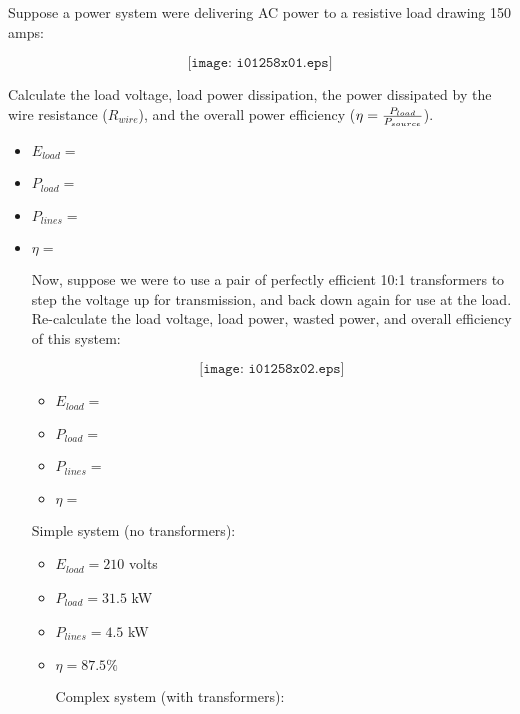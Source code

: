 

Suppose a power system were delivering AC power to a resistive load drawing 150 amps:

$$\texttt{[image: i01258x01.eps]}$$

Calculate the load voltage, load power dissipation, the power dissipated by the wire resistance ($R_{wire}$), and the overall power efficiency ($\eta = {P_{load} \over P_{source}}$).

\begin{itemize}
\item {} $E_{load} = $ 
\item {} $P_{load} = $ 
\item {} $P_{lines} = $ 
\item {} $\eta = $ 
\bigskip

Now, suppose we were to use a pair of perfectly efficient 10:1 transformers to step the voltage up for transmission, and back down again for use at the load.  Re-calculate the load voltage, load power, wasted power, and overall efficiency of this system:

$$\texttt{[image: i01258x02.eps]}$$

\begin{itemize}
\item {} $E_{load} = $ 
\item {} $P_{load} = $ 
\item {} $P_{lines} = $ 
\item {} $\eta = $ 
\end{itemize}







Simple system (no transformers):

\begin{itemize}
\item {} $E_{load} = 210$ volts
\item {} $P_{load} = 31.5$ kW
\item {} $P_{lines} = 4.5$ kW
\item {} $\eta = 87.5 \%$ 
\bigskip

Complex system (with transformers):


\end{itemize}
\end{itemize}

